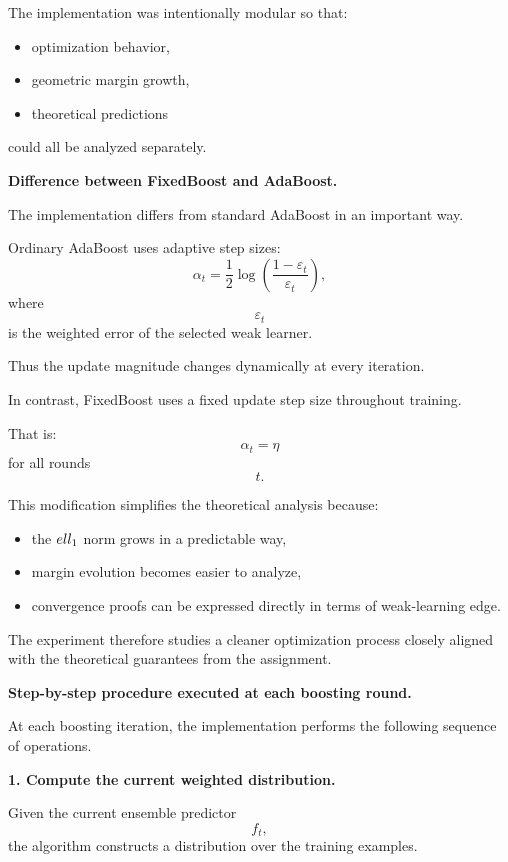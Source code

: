 \documentclass[11pt]{article}
\begin{document}
\begin{enumerate}
\begin{solutionbox}
The implementation was intentionally modular so that:
\begin{itemize}
    \item optimization behavior,
    \item geometric margin growth,
    \item theoretical predictions
\end{itemize}
could all be analyzed separately.

\medskip

\textbf{Difference between FixedBoost and AdaBoost.}

The implementation differs from standard AdaBoost in an important way.

Ordinary AdaBoost uses adaptive step sizes:
\[
\alpha_t
=
\frac12
\log
\left(
\frac{1-\varepsilon_t}{\varepsilon_t}
\right),
\]
where
\[
\varepsilon_t
\]
is the weighted error of the selected weak learner.

Thus the update magnitude changes dynamically at every iteration.

In contrast, FixedBoost uses a fixed update step size throughout training.

That is:
\[
\alpha_t=\eta
\]
for all rounds
\[
t.
\]

This modification simplifies the theoretical analysis because:
\begin{itemize}
    \item the $\\ell_1$ norm grows in a predictable way,
    \item margin evolution becomes easier to analyze,
    \item convergence proofs can be expressed directly in terms of weak-learning edge.
\end{itemize}

The experiment therefore studies a cleaner optimization process closely aligned with the theoretical guarantees from the assignment.

\medskip

\textbf{Step-by-step procedure executed at each boosting round.}

At each boosting iteration, the implementation performs the following sequence of operations.

\medskip

\textbf{1. Compute the current weighted distribution.}

Given the current ensemble predictor
\[
f_t,
\]
the algorithm constructs a distribution over the training examples.


\end{solutionbox}
\end{enumerate}
\end{document}
